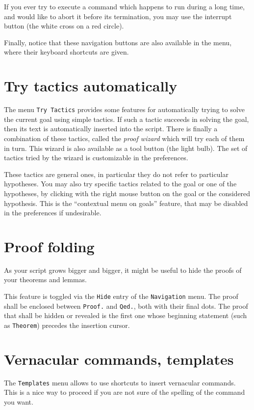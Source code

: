 If you ever try to execute a command which happens to run during a
long time, and would like to abort it before its
termination, you may use the interrupt button (the white cross on a red circle).
 
Finally, notice that these navigation buttons are also available in
the menu, where their keyboard shortcuts are given.

\section[Try tactics automatically]{Try tactics automatically\label{sec:trytactics}}

The menu \texttt{Try Tactics} provides some features for automatically
trying to solve the current goal using simple tactics. If such a
tactic succeeds in solving the goal, then its text is automatically
inserted into the script. There is finally a combination of these
tactics, called the \emph{proof wizard} which will try each of them in
turn. This wizard is also available as a tool button (the light
bulb).  The set of tactics tried by the wizard is customizable in
the preferences.

These tactics are general ones, in particular they do not refer to
particular hypotheses. You may also try specific tactics related to
the goal or one of the hypotheses, by clicking with the right mouse
button on the goal or the considered hypothesis. This is the
``contextual menu on goals'' feature, that may be disabled in the
preferences if undesirable.

\section{Proof folding}

As your script grows bigger and bigger, it might be useful to hide the proofs
of your theorems and lemmas.

This feature is toggled via the \texttt{Hide} entry of the \texttt{Navigation}
menu. The proof shall be enclosed between \texttt{Proof.} and \texttt{Qed.},
both with their final dots. The proof that shall be hidden or revealed is the
first one whose beginning statement (such as \texttt{Theorem}) precedes the
insertion cursor.
 
\section{Vernacular commands, templates}

The \texttt{Templates} menu allows to use shortcuts to insert
vernacular commands. This is a nice way to proceed if you are not sure
of the spelling of the command you want.


